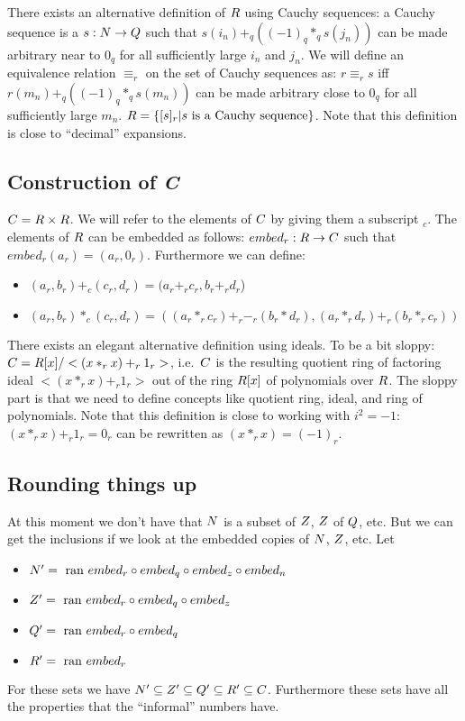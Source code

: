 There exists an alternative definition of $R$ using Cauchy sequences: a
Cauchy sequence is a $s: N \rightarrow Q$ such that $s(i_n) +_q
\left((-1)_q *_q s(j_n)\right)$ can be made arbitrary near to $0_q$ for all
sufficiently large $i_n$ and $j_n$. We will define an equivalence relation
$\equiv_r$ on the set of Cauchy sequences as: $r \equiv_r s$ iff $r(m_n) +_q
\left((-1)_q *_q s(m_n)\right)$ can be made arbitrary close to $0_q$ for all
sufficiently large $m_n$. $R = \{ [s]_r | s \mbox{ is a Cauchy sequence}\}$.
Note that this definition is close to ``decimal'' expansions.

\subsection{Construction of \sl C}

$C = R \times R$. We will refer to the elements of $C$ by giving them a
subscript $_c$. The elements of $R$ can be embedded as follows: $embed_r: R
\rightarrow C$ such that $embed_r(a_r) = (a_r,0_r)$. Furthermore we can
define:
\begin{itemize}
\item $(a_r,b_r) +_c (c_r,d_r) = (a_r +_r c_r, b_r +_r d_r$)
\item $(a_r,b_r) *_c (c_r,d_r) = \left((a_r *_r c_r) +_r -_r (b_r * d_r),
      (a_r *_r d_r) +_r (b_r *_r c_r)\right)$
\end{itemize}

There exists an elegant alternative definition using ideals. To be a bit
sloppy: $C = R[x] / <(x *_r x) +_r 1_r>$, i.e.\ $C$ is the resulting
quotient ring of factoring ideal $<(x *_r x) +_r 1_r>$ out of the ring
$R[x]$ of polynomials over $R$. The sloppy part is that we need to define
concepts like quotient ring, ideal, and ring of polynomials. Note that this
definition is close to working with $i^2=-1$: $(x *_r x) +_r 1_r = 0_r$ can be
rewritten as $(x *_r x) = (-1)_r$.

\subsection{Rounding things up}

At this moment we don't have that $N$ is a subset of $Z$, $Z$ of $Q$,
etc. But we can get the inclusions if we look at the embedded copies of $N$,
$Z$, etc. Let
\begin{itemize}
\item $N' = \mbox{ ran } embed_r \circ embed_q \circ embed_z \circ embed_n$
\item $Z' = \mbox{ ran } embed_r \circ embed_q \circ embed_z$
\item $Q' = \mbox{ ran } embed_r \circ embed_q$
\item $R' = \mbox{ ran } embed_r$
\end{itemize}
For these sets we have $N' \subseteq Z' \subseteq Q' \subseteq R'
\subseteq C$. Furthermore these sets have all the properties that the
``informal'' numbers have.

